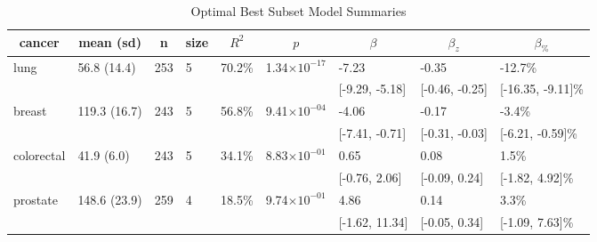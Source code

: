 %
\begin{table}[!tbp]
\caption{Optimal Best Subset Model Summaries\label{tab:best-subset}} 
\begin{center}
\begin{tabular}{lllllllll}
\hline\hline
\multicolumn{1}{c}{cancer}&\multicolumn{1}{c}{mean (sd)}&\multicolumn{1}{c}{n}&\multicolumn{1}{c}{size}&\multicolumn{1}{c}{$R^2$}&\multicolumn{1}{c}{$p$}&\multicolumn{1}{c}{$\beta$}&\multicolumn{1}{c}{$\beta_z$}&\multicolumn{1}{c}{$\beta_{\%}$}\tabularnewline
\hline
lung&56.8 (14.4)&253&5&70.2\%&1.34$\times10^{-17}$&-7.23&-0.35&-12.7\%\tabularnewline
&&&&&&[-9.29, -5.18]&[-0.46, -0.25]&[-16.35, -9.11]\%\tabularnewline
breast&119.3 (16.7)&243&5&56.8\%&9.41$\times10^{-04}$&-4.06&-0.17&-3.4\%\tabularnewline
&&&&&&[-7.41, -0.71]&[-0.31, -0.03]&[-6.21, -0.59]\%\tabularnewline
colorectal&41.9 (6.0)&243&5&34.1\%&8.83$\times10^{-01}$&0.65&0.08&1.5\%\tabularnewline
&&&&&&[-0.76, 2.06]&[-0.09, 0.24]&[-1.82, 4.92]\%\tabularnewline
prostate&148.6 (23.9)&259&4&18.5\%&9.74$\times10^{-01}$&4.86&0.14&3.3\%\tabularnewline
&&&&&&[-1.62, 11.34]&[-0.05, 0.34]&[-1.09, 7.63]\%\tabularnewline
\hline
\end{tabular}
\end{center}
\end{table}

